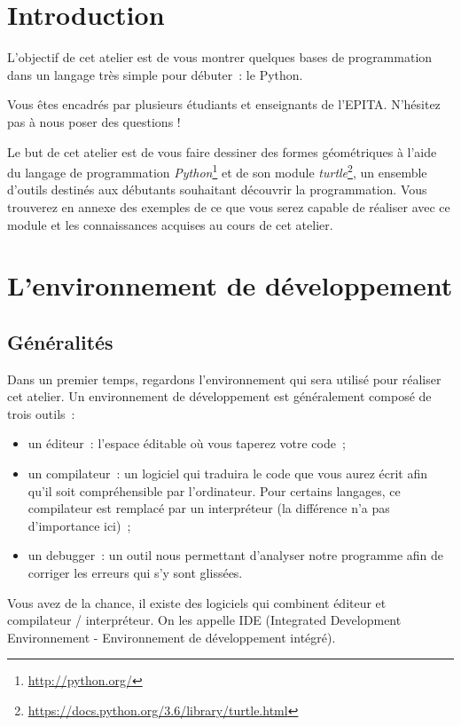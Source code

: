 \documentclass[11pt,a4paper]{article}
\begin{document}

\section{Introduction}
L'objectif de cet atelier est de vous montrer quelques bases de
programmation dans un langage très simple pour débuter~: le Python.

Vous êtes encadrés par plusieurs étudiants et enseignants de l'EPITA. N'hésitez
pas à nous poser des questions !

Le but de cet atelier est de vous faire dessiner des formes géométriques
à l'aide du langage de programmation
\emph{Python}\footnote{\url{http://python.org/}} et de son module
\emph{turtle}\footnote{\url{https://docs.python.org/3.6/library/turtle.html}},
un ensemble d'outils destinés aux débutants souhaitant découvrir la
programmation.  Vous trouverez en annexe des exemples de ce que vous serez
capable de réaliser avec ce module et les connaissances acquises au cours de cet
atelier.

\section{L'environnement de développement}
\subsection{Généralités}

Dans un premier temps, regardons l'environnement qui sera utilisé pour réaliser
cet atelier. Un environnement de développement est généralement composé de trois
outils~:

\begin{itemize}
    \item un éditeur~: l'espace éditable où vous taperez votre code~;
    \item un compilateur~: un logiciel qui traduira le code que vous aurez
        écrit afin qu'il soit compréhensible par l'ordinateur. Pour certains
        langages, ce compilateur est remplacé par un interpréteur (la différence
        n'a pas d'importance ici)~;
    \item un debugger~: un outil nous permettant d'analyser notre programme afin
        de corriger les erreurs qui s'y sont glissées.
\end{itemize}

Vous avez de la chance, il existe des logiciels qui combinent éditeur et
compilateur / interpréteur. On les appelle IDE (Integrated Development
Environnement - Environnement de développement intégré).
\end{document}
